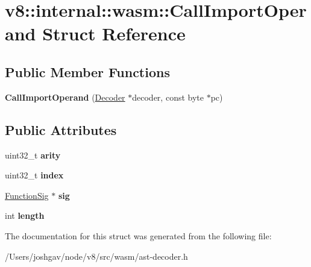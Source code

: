 \hypertarget{structv8_1_1internal_1_1wasm_1_1_call_import_operand}{}\section{v8\+:\+:internal\+:\+:wasm\+:\+:Call\+Import\+Operand Struct Reference}
\label{structv8_1_1internal_1_1wasm_1_1_call_import_operand}
\subsection*{Public Member Functions}
\begin{DoxyCompactItemize}
\item 
{\bfseries Call\+Import\+Operand} (\hyperlink{classv8_1_1internal_1_1wasm_1_1_decoder}{Decoder} $\ast$decoder, const byte $\ast$pc)\hypertarget{structv8_1_1internal_1_1wasm_1_1_call_import_operand_addc51a4b30b914a27691e5a7e1c60f3e}{}\label{structv8_1_1internal_1_1wasm_1_1_call_import_operand_addc51a4b30b914a27691e5a7e1c60f3e}

\end{DoxyCompactItemize}
\subsection*{Public Attributes}
\begin{DoxyCompactItemize}
\item 
uint32\+\_\+t {\bfseries arity}\hypertarget{structv8_1_1internal_1_1wasm_1_1_call_import_operand_afce2628a826eba9a94df05075d2b6a64}{}\label{structv8_1_1internal_1_1wasm_1_1_call_import_operand_afce2628a826eba9a94df05075d2b6a64}

\item 
uint32\+\_\+t {\bfseries index}\hypertarget{structv8_1_1internal_1_1wasm_1_1_call_import_operand_aa6b056ffd1e5c4949ea0eab34139d7b8}{}\label{structv8_1_1internal_1_1wasm_1_1_call_import_operand_aa6b056ffd1e5c4949ea0eab34139d7b8}

\item 
\hyperlink{classv8_1_1internal_1_1_signature}{Function\+Sig} $\ast$ {\bfseries sig}\hypertarget{structv8_1_1internal_1_1wasm_1_1_call_import_operand_ae8133267b2fb89ff4027c8450e758c26}{}\label{structv8_1_1internal_1_1wasm_1_1_call_import_operand_ae8133267b2fb89ff4027c8450e758c26}

\item 
int {\bfseries length}\hypertarget{structv8_1_1internal_1_1wasm_1_1_call_import_operand_addce17bebe13d1f863b482745890fcfa}{}\label{structv8_1_1internal_1_1wasm_1_1_call_import_operand_addce17bebe13d1f863b482745890fcfa}

\end{DoxyCompactItemize}


The documentation for this struct was generated from the following file\+:\begin{DoxyCompactItemize}
\item 
/\+Users/joshgav/node/v8/src/wasm/ast-\/decoder.\+h\end{DoxyCompactItemize}
